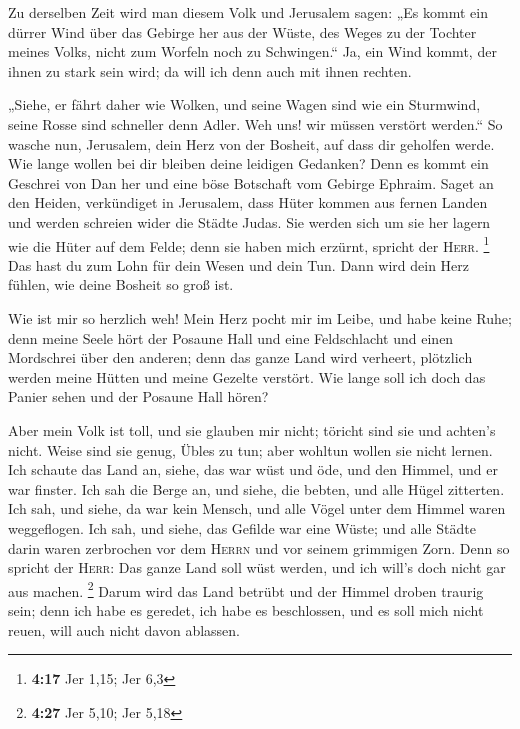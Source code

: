  Zu derselben Zeit wird man diesem Volk und Jerusalem
sagen: „Es kommt ein dürrer Wind über das Gebirge her aus der Wüste, des
Weges zu der Tochter meines Volks, nicht zum Worfeln noch zu
Schwingen.``  Ja, ein Wind kommt, der ihnen zu stark sein
wird; da will ich denn auch mit ihnen rechten.

 „Siehe, er fährt daher wie Wolken, und seine Wagen sind
wie ein Sturmwind, seine Rosse sind schneller denn Adler. Weh uns! wir
müssen verstört werden.``  So wasche nun, Jerusalem, dein
Herz von der Bosheit, auf dass dir geholfen werde. Wie lange wollen bei
dir bleiben deine leidigen Gedanken?  Denn es kommt ein
Geschrei von Dan her und eine böse Botschaft vom Gebirge Ephraim.
 Saget an den Heiden, verkündiget in Jerusalem, dass
Hüter kommen aus fernen Landen und werden schreien wider die Städte
Judas.  Sie werden sich um sie her lagern wie die Hüter
auf dem Felde; denn sie haben mich erzürnt, spricht der \textsc{Herr}.
\footnote{\textbf{4:17} Jer 1,15; Jer 6,3}  Das hast du
zum Lohn für dein Wesen und dein Tun. Dann wird dein Herz fühlen, wie
deine Bosheit so groß ist.

 Wie ist mir so herzlich weh! Mein Herz pocht mir im
Leibe, und habe keine Ruhe; denn meine Seele hört der Posaune Hall und
eine Feldschlacht  und einen Mordschrei über den anderen;
denn das ganze Land wird verheert, plötzlich werden meine Hütten und
meine Gezelte verstört.  Wie lange soll ich doch das
Panier sehen und der Posaune Hall hören?

 Aber mein Volk ist toll, und sie glauben mir nicht;
töricht sind sie und achten's nicht. Weise sind sie genug, Übles zu tun;
aber wohltun wollen sie nicht lernen.  Ich schaute das
Land an, siehe, das war wüst und öde, und den Himmel, und er war
finster.  Ich sah die Berge an, und siehe, die bebten,
und alle Hügel zitterten.  Ich sah, und siehe, da war
kein Mensch, und alle Vögel unter dem Himmel waren weggeflogen.
 Ich sah, und siehe, das Gefilde war eine Wüste; und alle
Städte darin waren zerbrochen vor dem \textsc{Herrn} und vor seinem
grimmigen Zorn.  Denn so spricht der \textsc{Herr}: Das
ganze Land soll wüst werden, und ich will's doch nicht gar aus machen.
\footnote{\textbf{4:27} Jer 5,10; Jer 5,18}  Darum wird
das Land betrübt und der Himmel droben traurig sein; denn ich habe es
geredet, ich habe es beschlossen, und es soll mich nicht reuen, will
auch nicht davon ablassen.

